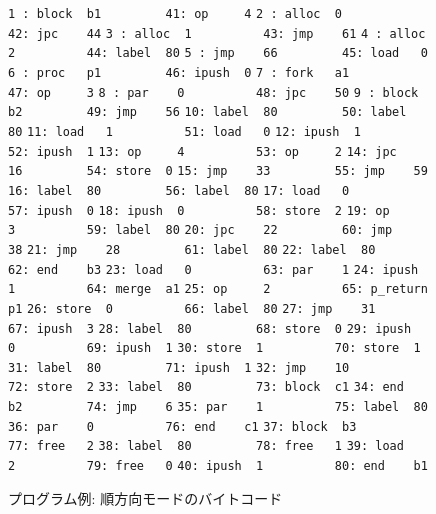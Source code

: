 \documentclass[submit,PRO]{ipsj}
\def\|{\verb|}
\begin{document}
\begin{figure}[tb]
\vbox{
\hbox{\|1 : block  b1         41: op     4|}
\hbox{\|2 : alloc  0          42: jpc    44|}
\hbox{\|3 : alloc  1          43: jmp    61|}
\hbox{\|4 : alloc  2          44: label  80|}
\hbox{\|5 : jmp    66         45: load   0|}
\hbox{\|6 : proc   p1         46: ipush  0|}
\hbox{\|7 : fork   a1         47: op     3|}
\hbox{\|8 : par    0          48: jpc    50|}
\hbox{\|9 : block  b2         49: jmp    56|}
\hbox{\|10: label  80         50: label  80|}
\hbox{\|11: load   1          51: load   0|}
\hbox{\|12: ipush  1          52: ipush  1|}
\hbox{\|13: op     4          53: op     2|}
\hbox{\|14: jpc    16         54: store  0|}
\hbox{\|15: jmp    33         55: jmp    59|}
\hbox{\|16: label  80         56: label  80|}
\hbox{\|17: load   0          57: ipush  0|}
\hbox{\|18: ipush  0          58: store  2|}
\hbox{\|19: op     3          59: label  80|}
\hbox{\|20: jpc    22         60: jmp    38|}
\hbox{\|21: jmp    28         61: label  80|}
\hbox{\|22: label  80         62: end    b3|}
\hbox{\|23: load   0          63: par    1|}
\hbox{\|24: ipush  1          64: merge  a1|}
\hbox{\|25: op     2          65: p_return p1|}
\hbox{\|26: store  0          66: label  80|}
\hbox{\|27: jmp    31         67: ipush  3|}
\hbox{\|28: label  80         68: store  0|}
\hbox{\|29: ipush  0          69: ipush  1|}
\hbox{\|30: store  1          70: store  1|}
\hbox{\|31: label  80         71: ipush  1|}
\hbox{\|32: jmp    10         72: store  2|}
\hbox{\|33: label  80         73: block  c1|}
\hbox{\|34: end    b2         74: jmp    6|}
\hbox{\|35: par    1          75: label  80|}
\hbox{\|36: par    0          76: end    c1|}
\hbox{\|37: block  b3         77: free   2|}
\hbox{\|38: label  80         78: free   1|}
\hbox{\|39: load   2          79: free   0|}
\hbox{\|40: ipush  1          80: end    b1|}
}
\centerline{}
\caption{プログラム例: 順方向モードのバイトコード}%
\label{fig:bytecode}
\end{figure}
\end{document}
